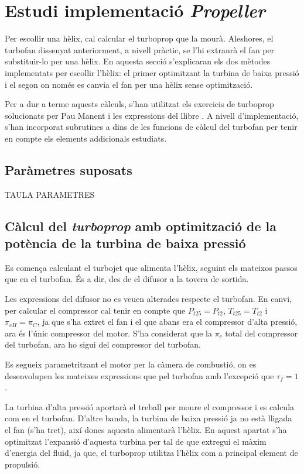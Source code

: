 \section{Estudi implementació \textit{Propeller}}
Per escollir una hèlix, cal calcular el turboprop que la mourà. Aleshores, el turbofan dissenyat anteriorment, a nivell pràctic, se l'hi extraurà el fan per substituir-lo per una hèlix. En aquesta secció s'explicaran els dos mètodes implementats per escollir l'hèlix: el primer optimitzant la turbina de baixa pressió i el segon on només es canvia el fan per una hèlix sense optimització.

\noindent Per a dur a terme aquests càlculs, s'han utilitzat els exercicis de turboprop solucionats per Pau Manent i les expressions del llibre \cite{mattingly}. A nivell d'implementació, s'han incorporat subrutines a dins de les funcions de càlcul del turbofan per tenir en compte els elements addicionals estudiats.
\subsection{Paràmetres suposats}

TAULA PARAMETRES

\subsection{Càlcul del \textit{turboprop} amb optimització de la potència de la turbina de baixa pressió}
Es comença calculant el turbojet que alimenta l'hèlix, seguint els mateixos passos que en el turbofan. És a dir, des de el difusor a la tovera de sortida.

\noindent Les expressions del difusor no es veuen alterades respecte el turbofan. En canvi, per calcular el compressor cal tenir en compte que $P_{t25}=P_{t2}$, $T_{t25}=T_{t2}$ i $\pi_{cH}=\pi_{C}$, ja que s'ha extret el fan i el que abans era el compressor d'alta pressió, ara és l'únic compressor del motor. S'ha considerat que la $\pi_c$ total del compressor del turbofan, ara ho sigui del compressor del turbofan.

\noindent Es segueix parametritzant el motor per la càmera de combustió, on es desenvolupen les mateixes expressions que pel turbofan amb l'excepció que $\tau_f=1$.

\noindent La turbina d'alta pressió aportarà el treball per moure el compressor i es calcula com en el turbofan. D'altre banda, la turbina de baixa pressió ja no està lligada el fan (s'ha tret), així doncs aquesta alimentarà l'hèlix. En aquest apartat s'ha optimitzat l'expansió d'aquesta turbina per tal de que extregui el màxim d'energia del fluid, ja que, el turboprop utilitza l'hèlix com a principal element de propulsió. 

